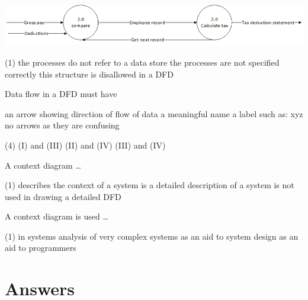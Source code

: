 \documentclass{article}
\begin{document}
\begin{questions}
\begin{exercise}
        \includegraphics{Q5.png}
        \begin{choice}(1)
            \choice the processes do not refer to a data store
            \choice {}
            \choice the processes are not specified correctly
            \choice this structure is disallowed in a DFD
        \end{choice}
    \end{exercise}
    \begin{exercise}
        Data flow in a DFD must have
        \begin{tasks}
            \task an arrow showing direction of flow of data
            \task a meaningful name
            \task a label such as: xyz
            \task no arrows as they are confusing
        \end{tasks}
        \begin{choice}(4)
            \choice (I) and (III)
            \choice (II) and (IV)
            \choice (III) and (IV)
            \choice {}
        \end{choice}
    \end{exercise}
    \begin{exercise}
        A context diagram \dots
        \begin{choice}(1)
            \choice describes the context of a system
            \choice  {}
            \choice is a detailed description of a system
            \choice is not used in drawing a detailed DFD
        \end{choice}
    \end{exercise}
    \begin{exercise}
        A context diagram is used \dots
        \begin{choice}(1)
            \choice {}
            \choice in systems analysis of very complex systems
            \choice as an aid to system design
            \choice as an aid to programmers
        \end{choice}
    \end{exercise}
\end{questions}
\newpage
\section*{Answers}
\begin{multicols}{2}
    \getanswers
\end{multicols}
\end{document}
